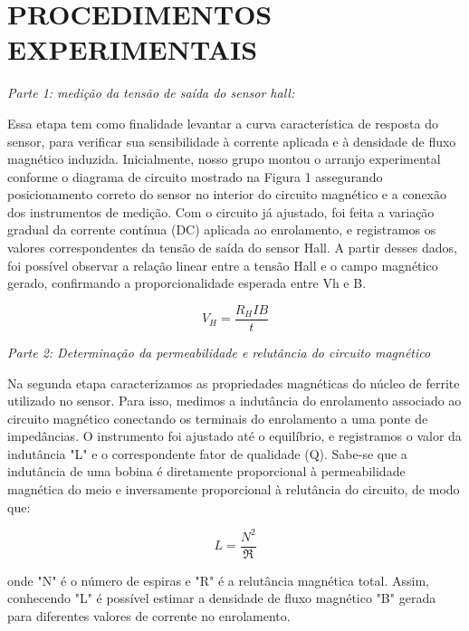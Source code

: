 \documentclass[10pt,twocolumn,letterpaper]{article}
\begin{document}

\section{PROCEDIMENTOS EXPERIMENTAIS}

\noindent\textit{Parte 1: medição da tensão de saída do sensor hall:}

\hspace{1cm}   Essa etapa tem como finalidade levantar a curva característica de resposta do sensor, para verificar sua sensibilidade à corrente aplicada e à densidade de fluxo magnético induzida. Inicialmente, nosso grupo montou o arranjo experimental conforme o diagrama de circuito mostrado na Figura 1 assegurando posicionamento correto do sensor no interior do circuito magnético e a conexão dos instrumentos de medição.
Com o circuito já ajustado, foi feita a variação gradual da corrente contínua (DC) aplicada ao enrolamento, e  registramos os valores correspondentes da tensão de saída do sensor Hall.  A partir desses dados, foi possível observar a relação linear entre a tensão Hall e o campo magnético gerado, confirmando a proporcionalidade esperada entre 
Vh e B.

\begin{equation*}
    V_H = \frac{R_H I B}{t} 
\end{equation*}

\noindent\textit{Parte 2: Determinação da permeabilidade e relutância do circuito magnético}

\hspace{1cm} Na segunda etapa caracterizamos as propriedades magnéticas do núcleo de ferrite utilizado no sensor. Para isso, medimos a indutância do enrolamento associado ao circuito magnético conectando os terminais do enrolamento a uma ponte de impedâncias. O instrumento foi ajustado até o equilíbrio, e registramos o valor da indutância "L" e o correspondente fator de qualidade (Q). Sabe-se que a indutância de uma bobina é diretamente proporcional à permeabilidade magnética do meio e inversamente proporcional à relutância do circuito, de modo que:

\begin{equation*}
    L = \frac{N^2}{\mathfrak{R}}
\end{equation*}

onde "N" é o número de espiras e 
"R" é a relutância magnética total. Assim, conhecendo "L"
é possível estimar a densidade de fluxo magnético "B"
gerada para diferentes valores de corrente no enrolamento.
\end{document}
